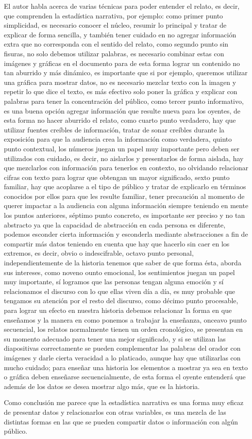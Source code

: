\documentclass{article}\usepackage[]{graphicx}\usepackage[]{color}
\begin{document}
{\setlength{\parskip}{7mm} \large El autor habla acerca de varias t\'ecnicas para poder entender el relato, es decir, que comprenden la estad\'istica narrativa, por ejemplo: como primer punto simplicidad, es necesario conocer el n\'ucleo, resumir lo principal y tratar de explicar de forma sencilla, y tambi\'en tener cuidado en no agregar informaci\'on extra que no corresponda con el sentido del relato, como segundo punto sin fisuras, no solo debemos utilizar palabras, es necesario combinar estas con im\'agenes y gr\'aficas en el documento para de esta forma lograr un contenido no tan aburrido y m\'as din\'amico, es importante que si por ejemplo, queremos utilizar una gr\'afica para mostrar datos, no es necesario mezclar texto con la imagen y repetir lo que dice el texto, es m\'as efectivo solo poner la gr\'afica y explicar con palabras para tener la concentraci\'on del p\'ublico, como tercer punto informativo, es una buena opci\'on agregar informaci\'on que resulte nueva para los oyentes, de esta forma no hacer aburrido el relato, como cuarto punto verdadero, hay que utilizar fuentes cre\'ibles de informaci\'on, tratar de sonar cre\'ibles durante la exposici\'on para que la audiencia crea la informaci\'on como verdadera, quinto punto contextual, los n\'umeros juegan un papel muy importante pero deben ser utilizados con cuidado, es decir, no aislarlos y presentarlos de forma aislada, hay que mezclarlos con informaci\'on para tenerlos en contexto, no olvidando relacionar cifras con texto para lograr que obtengan un mayor significado, sexto punto familiar, hay que acoplarse a el tipo de p\'ublico y tratar de explicarlo en t\'erminos conocidos por ellos para que les resulte familiar, tener precauci\'on al momento de querer impactar a la audiencia con alguna informaci\'on siempre teniendo en mente los puntos anteriores, s\'eptimo punto concreto, es importante ser preciso y no tan abstracto ya que la capacidad de abstracci\'on en cada persona es diferente, podemos esconder cierta informaci\'on y esconderla mediante abstracciones a fin de compartir m\'as datos teniendo en cuenta que hay que hacerlo sin caer en los extremos, es decir, obvio o indescifrable, octavo punto personal, independientemente de la historia tenemos que saber de que forma \'esta, aborda sus intereses, como noveno ounto emocional, los sentimientos juegan un papel muy importante, s\'i logramos que las personas tengan alguna emoci\'on y s\'i relacionamos el discurso con lo que ellas viven d\'ia a d\'ia, es muy probable que tengamos su atenci\'on por el resto del discurso, como d\'ecimo punto procesable, para lograr un efecto en nuestra historia debemos relacionar la forma en que ense\~namos y la manera en como ponemos a trabajar la ense\~nanza, onceavo punto secuencial, los relatos normalmente tienen un orden cronol\'ogico, se presentan en su momento adecuado para tener una mejor significado, y si se utilizan las diapositivas correctamente se pueden complementar las palabras del orador con im\'agenes y darle cierta veracidad a lo platicado, aunque hay que utilizarlas con mucho cuidado; para ense\~nar una historia los elementos a mostrar ya sea en texto o gr\'afica deben ense\~narse secuencialmente, de esta forma el oyente entender\'a que adem\'as de los datos se desea mostrar algo m\'as, que es la historia.}

{\setlength{\parskip}{7mm} \large Como conclusi\'on me parece que la estad\'istica narrativa es una forma muy eficaz de presentar datos y relacionarlos con otras variables, es una mezcla de las distintas formas en las que se pueden compartir datos o informaci\'on con alg\'un p\'ublico.}
\end{document}
